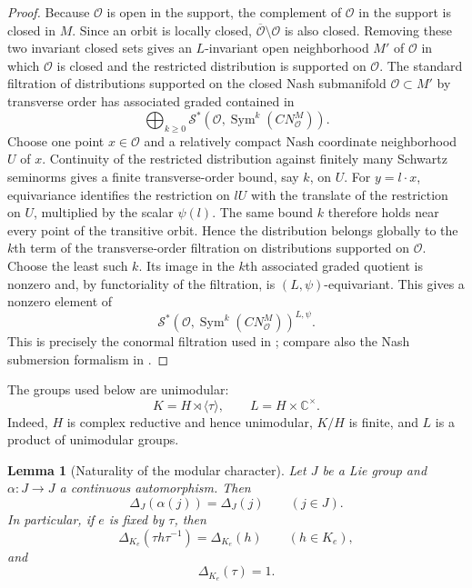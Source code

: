 \documentclass[11pt,reqno]{amsart}
\numberwithin{equation}{section}
\newtheorem{lemma}[theorem]{Lemma}
\theoremstyle{definition}
\theoremstyle{remark}
\newcommand{\C}{\mathbb C}
\newcommand{\Sym}{\operatorname{Sym}}
\newcommand{\cS}{\mathcal S}
\begin{document}
\begin{proof}
Because \(\mathcal O\) is open in the support,
the complement of \(\mathcal O\) in the support is closed in \(M\).  Since an orbit is
locally closed, \(\overline{\mathcal O}\setminus\mathcal O\) is also
closed.  Removing these two invariant closed sets gives an
\(L\)-invariant open neighborhood \(M'\) of \(\mathcal O\) in which
\(\mathcal O\) is closed and the restricted distribution is supported on
\(\mathcal O\).  The standard filtration of distributions supported on the
closed Nash submanifold \(\mathcal O\subset M'\) by transverse order has
associated graded contained in
\[
  \bigoplus_{k\geq0}
  \cS^*\!\left(\mathcal O,
  \Sym^k(CN_{\mathcal O}^{M})\right).
\]
Choose one point $x\in\mathcal O$ and a relatively compact Nash coordinate
neighborhood $U$ of $x$.  Continuity of the restricted distribution against
finitely many Schwartz seminorms gives a finite transverse-order bound, say
$k$, on $U$.  For $y=l\cdot x$, equivariance identifies the restriction on
$lU$ with the translate of the restriction on $U$, multiplied by the scalar
$\psi(l)$.  The same bound $k$ therefore holds near every point of the
transitive orbit.  Hence the distribution belongs globally to the $k$th term
of the transverse-order filtration on distributions supported on
$\mathcal O$.  Choose the least such $k$.  Its image in the $k$th associated
graded quotient is nonzero and, by functoriality of the filtration, is
$(L,\psi)$-equivariant.  This gives a nonzero element of
\[
 \cS^*\!\left(\mathcal O,\Sym^k(CN_{\mathcal O}^{M})\right)^{L,\psi}.
\]
This is precisely the conormal filtration used in
\cite[Theorem~2.5.6]{AG09}; compare also the Nash submersion formalism in
\cite[Appendix~B]{AG09}.
\end{proof}

The groups used below are unimodular:
\[
  K=H\rtimes\langle\tau\rangle,
  \qquad L=H\times\C^\times.
\]
Indeed, \(H\) is complex reductive and hence unimodular, \(K/H\) is finite,
and \(L\) is a product of unimodular groups.

\begin{lemma}[Naturality of the modular character]
\label{cii:lem:modular-naturality}
Let \(J\) be a Lie group and \(\alpha:J\to J\) a continuous
automorphism.  Then
\[
\Delta_J(\alpha(j))=\Delta_J(j)
\qquad(j\in J).
\]
In particular, if \(e\) is fixed by \(\tau\), then
\[
\Delta_{K_e}(\tau h\tau^{-1})=\Delta_{K_e}(h)
\qquad(h\in K_e),
\]
and
\[
\Delta_{K_e}(\tau)=1.
\]
\end{lemma}
\end{document}
